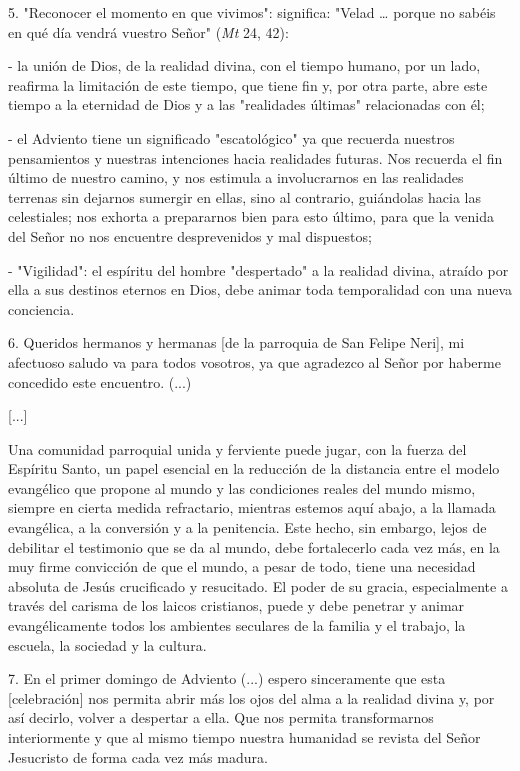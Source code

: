 5. "Reconocer el momento en que vivimos": significa: "Velad \ldots{}
porque no sabéis en qué día vendrá vuestro Señor" (\emph{Mt} 24, 42):

- la unión de Dios, de la realidad divina, con el tiempo humano, por un
lado, reafirma la limitación de este tiempo, que tiene fin y, por otra
parte, abre este tiempo a la eternidad de Dios y a las "realidades
últimas" relacionadas con él;

- el Adviento tiene un significado "escatológico" ya que recuerda
nuestros pensamientos y nuestras intenciones hacia realidades futuras.
Nos recuerda el fin último de nuestro camino, y nos estimula a
involucrarnos en las realidades terrenas sin dejarnos sumergir en ellas,
sino al contrario, guiándolas hacia las celestiales; nos exhorta a
prepararnos bien para esto último, para que la venida del Señor no nos
encuentre desprevenidos y mal dispuestos;

- "Vigilidad": el espíritu del hombre "despertado" a la realidad divina,
atraído por ella a sus destinos eternos en Dios, debe animar toda
temporalidad con una nueva conciencia.

6. Queridos hermanos y hermanas {[}de la parroquia de San Felipe
Neri{]}, mi afectuoso saludo va para todos vosotros, ya que agradezco al
Señor por haberme concedido este encuentro. (...)

{[}...{]}

Una comunidad parroquial unida y ferviente puede jugar, con la fuerza
del Espíritu Santo, un papel esencial en la reducción de la distancia
entre el modelo evangélico que propone al mundo y las condiciones reales
del mundo mismo, siempre en cierta medida refractario, mientras estemos
aquí abajo, a la llamada evangélica, a la conversión y a la penitencia.
Este hecho, sin embargo, lejos de debilitar el testimonio que se da al
mundo, debe fortalecerlo cada vez más, en la muy firme convicción de que
el mundo, a pesar de todo, tiene una necesidad absoluta de Jesús
crucificado y resucitado. El poder de su gracia, especialmente a través
del carisma de los laicos cristianos, puede y debe penetrar y animar
evangélicamente todos los ambientes seculares de la familia y el
trabajo, la escuela, la sociedad y la cultura.

7. En el primer domingo de Adviento (...) espero sinceramente que esta
{[}celebración{]} nos permita abrir más los ojos del alma a la realidad
divina y, por así decirlo, volver a despertar a ella. Que nos permita
transformarnos interiormente y que al mismo tiempo nuestra humanidad se
revista del Señor Jesucristo de forma cada vez más madura.

